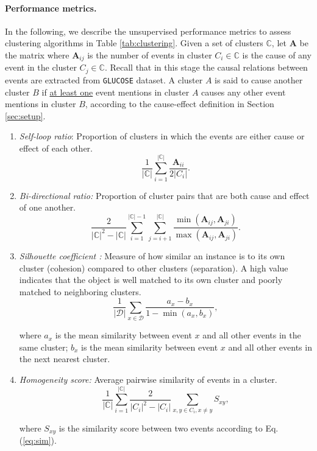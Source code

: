 \paragraph{Performance metrics.} In the following, we describe the unsupervised performance metrics to assess clustering algorithms in Table \ref{tab:clustering}. Given a set of clusters $\mathbb{C}$, let $\boldsymbol{A}$ be the matrix where $\boldsymbol{A}_{ij}$ is the number of events in cluster $C_i \in \mathbb{C} $ is the cause of any event in the cluster $C_j \in \mathbb{C}$. Recall that in this stage the causal relations between events are extracted from \texttt{GLUCOSE} dataset. A cluster $A$ is said to cause another cluster $B$ if \underline{at least one} event mentions in cluster $A$ causes any other event mentions in cluster $B$, according to the cause-effect definition in Section \ref{sec:setup}. 


\begin{enumerate}
    \item \textit{Self-loop ratio}: Proportion of clusters in which the events are either cause or effect of each other. 
    $$\frac{1}{|\mathbb{C}|} \sum_{i=1}^{|\mathbb{C}|} \frac{\boldsymbol{A}_{ii}}{2 |C_i|}.$$

    \item \textit{Bi-directional ratio:} Proportion of cluster pairs that are both cause and effect of one another.  
    $$\frac{2}{|\mathbb{C}|^2 - |\mathbb{C}|} \sum_{i=1}^{|\mathbb{C}|-1} \sum_{j=i+1}^{|\mathbb{C}|} \frac{\min (\boldsymbol{A}_{ij}, \boldsymbol{A}_{ji})}{\max (\boldsymbol{A}_{ij}, \boldsymbol{A}_{ji})}.$$

    \item \textit{Silhouette coefficient \citep{rousseeuw1987silhouettes}:}  Measure of how similar an instance is to its own cluster (cohesion) compared to other clusters (separation). A high value indicates that the object is well matched to its own cluster and poorly matched to neighboring clusters.  
    $$\frac{1}{|\mathcal{D}|} \sum_{x \in \mathcal{D}} \frac{a_x - b_x}{1 - \min(a_x,b_x)},$$
    
    where $a_x$ is the mean similarity between event $x$ and all other events in the same cluster; $b_x$ is the mean similarity between event $x$ and all other events in the next nearest cluster.

    \item \textit{Homogeneity score:} Average pairwise similarity of events in a cluster.
    $$\frac{1}{|\mathbb{C}|} \sum_{i=1}^{|\mathbb{C}|} \frac{2}{|C_i|^2-|C_i|}\sum_{x,y \in C_i, x \ne y}S_{xy},$$
    
    where $S_{xy}$ is the similarity score between two events according to Eq. (\ref{eq:sim}).
\end{enumerate}

